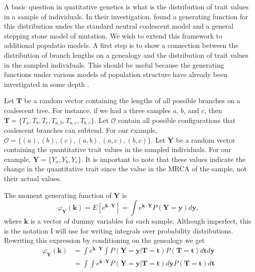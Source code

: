 A basic question in quatitative genetics is what is the distribution of trait
values in a sample of individuals. In their investigation, \citet{Schraiber2015}
found a generating function for this distribution undes the standard neutral
coalescent model and a general stepping stone model of mutation. We wish to
extend this framework to additional populatio models. A first step is to show a
connection between the distribution of branch lengths on a genealogy and the
distribution of trait values in the sampled individuals. This should be useful
because the generating functions under various models of population structure
have already been investigated in some depth \citep{Lohse2011}.

Let $\mathbf{T}$ be a random vector containing the lengths of all possible
branches on a coalescent tree. For instance, if we had a three samples $a$, $b$,
and $c$, then $\mathbf{T}=\{T_a,T_b,T_c,T_{a,b},T_{a,c},T_{b,c}\}$. Let
$\mathcal{O}$ contain all possible configurations that coalescent branches can
subtend. For our example, $\mathcal{O}=\{(a),(b),(c),(a,b),(a,c),(b,c)\}$. Let
$\mathbf{Y}$ be a random vector containing the quantitative trait values in the
sampled individuals. For our example, $\mathbf{Y}=\{Y_a,Y_b,Y_c\}$. It is
important to note that these values indicate the change in the quantitative
trait since the value in the MRCA of the sample, not their actual values.

The moment generating function of $\mathbf{Y}$ is
\begin{equation}
  \varphi_{\mathbf{Y}}(\mathbf{k}) = E\left[ e^{\mathbf{k} \cdot \mathbf{Y}} \right] =
  \int e^{\mathbf{k} \cdot \mathbf{Y}} P(\mathbf{Y}=\mathbf{y}) d\mathbf{y},
\end{equation}
where $\mathbf{k}$ is a vector of dummy variables for each
sample. Although imperfect, this is the notation I will use for
writing integrals over probability distributions. Rewriting this
expression by conditioning on the genealogy we get
\begin{align}
  \varphi_{\mathbf{Y}}(\mathbf{k}) &= \int e^{\mathbf{k} \cdot \mathbf{Y}}
  \int P(\mathbf{Y}=\mathbf{y} | \mathbf{T}=\mathbf{t}) P(\mathbf{T}=\mathbf{t})
  d\mathbf{t} d\mathbf{y}\\
  &= \int \int e^{\mathbf{k} \cdot \mathbf{Y}} P(\mathbf{Y}=\mathbf{y} | \mathbf{T}=\mathbf{t}) d\mathbf{y}
  P(\mathbf{T}=\mathbf{t})
  d\mathbf{t}
\end{align}

